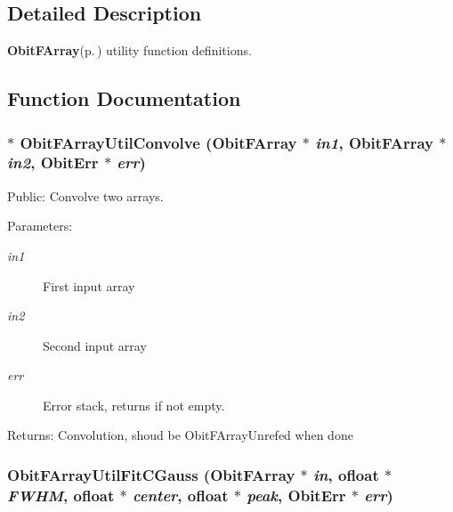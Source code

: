\subsection{Detailed Description}
{\bf Obit\-FArray}{\rm (p.\,\pageref{structObitFArray})} utility function definitions. 



\subsection{Function Documentation}
\subsubsection{$\ast$ Obit\-FArray\-Util\-Convolve ({\bf Obit\-FArray} $\ast$ {\em in1}, {\bf Obit\-FArray} $\ast$ {\em in2}, {\bf Obit\-Err} $\ast$ {\em err})}\label{ObitFArrayUtil_8c_a2}


Public: Convolve two arrays. 

\begin{Desc}
\item[Parameters:]
\begin{description}
\item[{\em in1}]First input array \item[{\em in2}]Second input array \item[{\em err}]Error stack, returns if not empty. \end{description}
\end{Desc}
\begin{Desc}
\item[Returns:]Convolution, shoud be Obit\-FArray\-Unrefed when done \end{Desc}
\subsubsection{ Obit\-FArray\-Util\-Fit\-CGauss ({\bf Obit\-FArray} $\ast$ {\em in}, {\bf ofloat} $\ast$ {\em FWHM}, {\bf ofloat} $\ast$ {\em center}, {\bf ofloat} $\ast$ {\em peak}, {\bf Obit\-Err} $\ast$ {\em err})}\label{ObitFArrayUtil_8c_a1}


